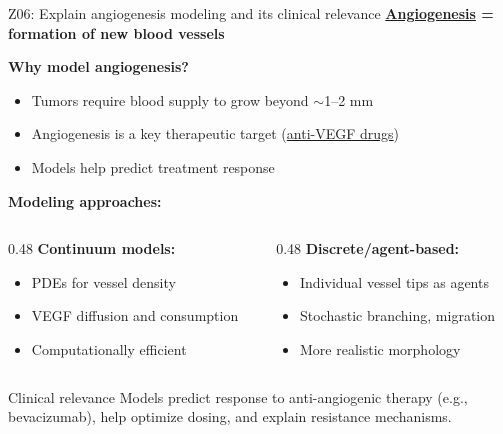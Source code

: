 \documentclass[aspectratio=169, 10pt]{beamer}
\begin{document}
\begin{frame}{Z06: Explain angiogenesis modeling and its clinical relevance}
    \textbf{\href{https://en.wikipedia.org/wiki/Angiogenesis}{Angiogenesis} = formation of new blood vessels}
    
    \vspace{0.2cm}
    \textbf{Why model angiogenesis?}
    \begin{itemize}
        \item Tumors require blood supply to grow beyond $\sim$1--2 mm
        \item Angiogenesis is a key therapeutic target (\href{https://en.wikipedia.org/wiki/Angiogenesis_inhibitor}{anti-VEGF drugs})
        \item Models help predict treatment response
    \end{itemize}
    
    \vspace{0.2cm}
    \textbf{Modeling approaches:}
    \begin{columns}[T]
        \begin{column}{0.48\textwidth}
            \textbf{Continuum models:}
            \begin{itemize}
                \item PDEs for vessel density
                \item VEGF diffusion and consumption
                \item Computationally efficient
            \end{itemize}
        \end{column}
        \begin{column}{0.48\textwidth}
            \textbf{Discrete/agent-based:}
            \begin{itemize}
                \item Individual vessel tips as agents
                \item Stochastic branching, migration
                \item More realistic morphology
            \end{itemize}
        \end{column}
    \end{columns}
    
    \vspace{0.2cm}
    {\small
    \begin{alertblock}{Clinical relevance}
        Models predict response to anti-angiogenic therapy (e.g., bevacizumab), help optimize dosing, and explain resistance mechanisms.
    \end{alertblock}
    }
\end{frame}
\end{document}

